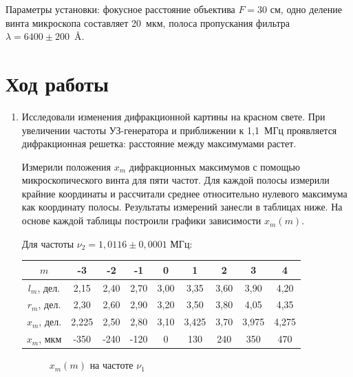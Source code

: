 \documentclass[a4paper,12pt]{article}
\begin{document}
    Параметры установки: фокусное расстояние объектива $F = 30 $ см, одно деление винта микроскопа составляет 20~мкм, полоса пропускания фильтра \mbox{$\lambda = 6400\pm 200$ Å}.
	
	\section*{Ход работы}
	\begin{enumerate}
	    \item Исследовали изменения дифракционной картины на красном свете. При увеличении частоты УЗ-генератора и приближении к 1,1~МГц проявляется дифракционная решетка: расстояние между максимумами растет.
	    
	    Измерили положения $ x_m $ дифракционных максимумов с помощью микроскопического винта для пяти частот. Для каждой полосы измерили крайние координаты и рассчитали среднее относительно нулевого максимума как координату полосы. Результаты измерений занесли в таблицах ниже. На основе каждой таблицы построили графики зависимости $ x_m (m) $.
	    
	    Для частоты $\nu_2=1{,}0116\pm 0{,}0001$ МГц:
	    \begin{center}
	    \begin{tabular}{|c|c|c|c|c|c|c|c|c|}
            \hline
            $m$ & -3 & -2 & -1 & 0 & 1 & 2 & 3 & 4 \\ \hline
            $l_m$, дел. & 2,15 & 2,40 & 2,70 & 3,00 & 3,35 & 3,60 & 3,90 & 4,20 \\ \hline
            $r_m$, дел. & 2,30 & 2,60 & 2,90 & 3,20 & 3,50 & 3,80 & 4,05 & 4,35 \\ \hline
            $x_m$, дел. & 2,225 & 2,50 & 2,80 & 3,10 & 3,425 & 3,70 & 3,975 & 4,275 \\ \hline
            $x_m$, мкм & -350 & -240 & -120 & 0 & 130 & 240 & 350 & 470 \\ \hline
        \end{tabular}
	    \end{center}
	\begin{figure}[!htb] \centering
		\caption{$x_m(m)$ на частоте $\nu_1$}
	\end{figure}
	

\end{enumerate}
\end{document}
